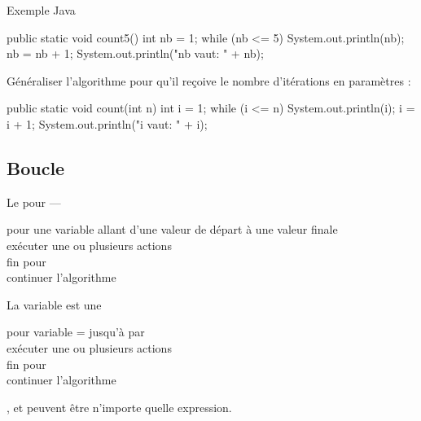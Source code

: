 \begin{hideedit}
\begin{frame}[fragile]{Exemple Java}
  \begin{java}
public static void count5() {
    int nb = 1;
    while (nb <= 5) {
        System.out.println(nb);
        nb = nb + 1;
    }
    System.out.println("nb vaut: " + nb);
}
  \end{java}
\end{frame}

\begin{frame}[fragile]
  Généraliser l'algorithme pour qu'il reçoive le nombre
  d'itérations en paramètres :
  \pause
  \begin{java}
public static void count(int n) {
    int i = 1;
    while (i <= n) {
        System.out.println(i);
        i = i + 1;
    }
    System.out.println("i vaut: " + i);
}
  \end{java}
\end{frame}

\subsection{Boucle }
\begin{frame}{Le \og pour \fg --- }
  \begin{langagenaturel}
    pour une variable allant d'une valeur de départ à une valeur finale\\
    \tab exécuter une ou plusieurs actions\\
    fin pour \\
    continuer l'algorithme 
  \end{langagenaturel}

  \pause
  La variable est une 

  \pause
  \begin{langagenaturel}
    pour variable =  jusqu'à  par \\
    \tab exécuter une ou plusieurs actions\\
    fin pour \\
    continuer l'algorithme
  \end{langagenaturel}

  ,  et  peuvent être n'importe quelle expression.
\end{frame}


\end{hideedit}
